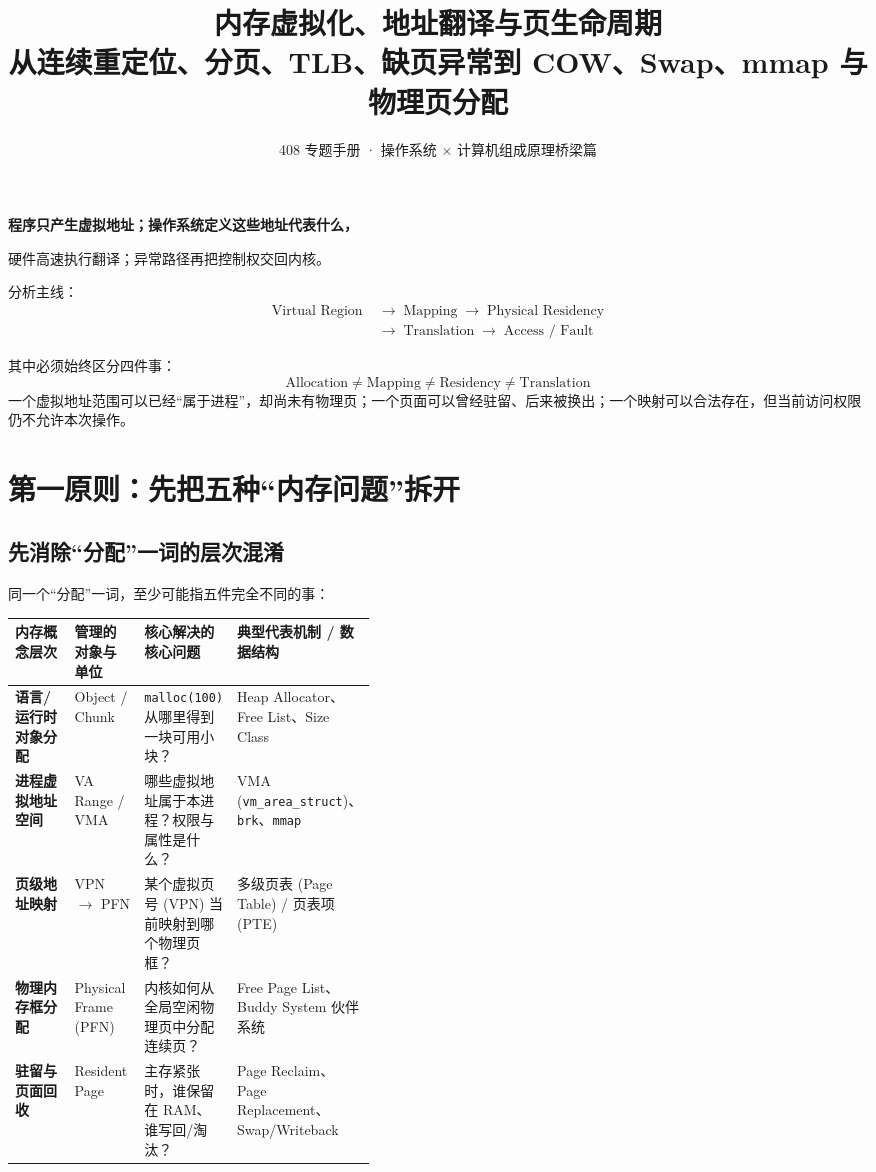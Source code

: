 \documentclass[11pt,a4paper]{ctexart}
\title{\vspace{-1.2cm}\textbf{内存虚拟化、地址翻译与页生命周期}\\[0.35em]
\large 从连续重定位、分页、TLB、缺页异常到 COW、Swap、mmap 与物理页分配}
\author{408 专题手册 · 操作系统 × 计算机组成原理桥梁篇}
\date{}
\newcommand{\code}[1]{\texttt{#1}}
\newcommand{\arr}{\;\longrightarrow\;}
\begin{document}
\maketitle

\begin{corebox}
\begin{center}
\Large\bfseries 程序只产生虚拟地址；操作系统定义这些地址代表什么，\par
硬件高速执行翻译；异常路径再把控制权交回内核。
\end{center}

分析主线：
\[
\boxed{
\begin{aligned}
\text{Virtual Region} &\arr \text{Mapping} \arr \text{Physical Residency} \\
&\arr \text{Translation} \arr \text{Access / Fault}
\end{aligned}
}
\]

其中必须始终区分四件事：
\[
\boxed{
\text{Allocation}
\neq
\text{Mapping}
\neq
\text{Residency}
\neq
\text{Translation}
}
\]
一个虚拟地址范围可以已经“属于进程”，却尚未有物理页；一个页面可以曾经驻留、后来被换出；一个映射可以合法存在，但当前访问权限仍不允许本次操作。
\end{corebox}

\tableofcontents
\newpage

\section{第一原则：先把五种“内存问题”拆开}

\subsection{先消除“分配”一词的层次混淆}
同一个“分配”一词，至少可能指五件完全不同的事：

\begin{center}
\begingroup
\small
\renewcommand{\arraystretch}{1.25}
\setlength{\tabcolsep}{6pt}
\begin{tabularx}{\linewidth}{>{\bfseries}p{0.22\linewidth} p{0.2\linewidth} X X}
\toprule
内存概念层次 & 管理的对象与单位 & 核心解决的核心问题 & 典型代表机制 / 数据结构\\
\midrule
语言/运行时对象分配 & Object / Chunk & \code{malloc(100)} 从哪里得到一块可用小块？ & Heap Allocator、Free List、Size Class\\
进程虚拟地址空间 & VA Range / VMA & 哪些虚拟地址属于本进程？权限与属性是什么？ & VMA (\code{vm\_area\_struct})、\code{brk}、\code{mmap}\\
页级地址映射 & VPN $\rightarrow$ PFN & 某个虚拟页号 (VPN) 当前映射到哪个物理页框？ & 多级页表 (Page Table) / 页表项 (PTE)\\
物理内存框分配 & Physical Frame (PFN) & 内核如何从全局空闲物理页中分配连续页？ & Free Page List、Buddy System 伙伴系统\\
驻留与页面回收 & Resident Page & 主存紧张时，谁保留在 RAM、谁写回/淘汰？ & Page Reclaim、Page Replacement、Swap/Writeback\\
\bottomrule
\end{tabularx}
\endgroup
\end{center}
\end{document}
